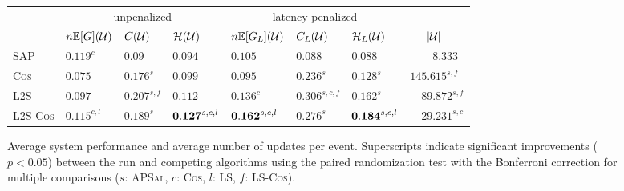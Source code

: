 \begin{figure}[t]
    \center
\begin{tabular}{ l   l l l   l l l  l }
\toprule
   &\multicolumn{3}{c}{unpenalized}&\multicolumn{3}{c}{latency-penalized}&\\
 \cmidrule(lr){2-4} \cmidrule(lr){5-7}
   & $n\mathbb{E}[G](\mathcal{U})$     & $C(\mathcal{U})$ 
        & $\mathcal{H}(\mathcal{U})$ & $n\mathbb{E}[G_L](\mathcal{U})$     & $C_L(\mathcal{U})$ & $\mathcal{H}_L(\mathcal{U})$ & ~~~${\left\vert \mathcal{U} \right\vert}$\\
    \bottomrule
\textsc{SAP}      
    & $\mathbf{0.119}^c$ & $0.09$                     & $0.094$ 
    & $0.105$            & $0.088$                    & $0.088$ 
    & ~~~~$8.333$ \\
\textsc{Cos}     
    & $0.075$            & $0.176^{s}$              & $0.099$ 
    & $0.095$            & $0.236^{s}$              & $0.128^{s}$ 
    & $145.615^{s,f}$ \\
\textsc{L2S}       
    & $0.097$            & $\mathbf{0.207}^{s,f}$   & $0.112$ 
    & $0.136^{c}$      & $\mathbf{0.306}^{s,c,f}$ & $0.162^{s}$
    & ~~$89.872^{s,f}$ \\
\textsc{L2S-Cos}
    & $0.115^{c,l}$        & $0.189^{s}$ & ${\bf0.127}^{s,c,l}$
    & ${\bf0.162}^{s,c,l}$ & $0.276^{s}$ & ${\bf0.184}^{s,c,l}$
 & ~~$29.231^{s,c}$ \\
\bottomrule
\end{tabular}
\caption{
 Average system performance 
 and average number of updates per event.
 Superscripts indicate significant improvements ($p < 0.05$) between the run and
 competing algorithms using the 
  paired randomization test with the Bonferroni correction for multiple 
  comparisons ($s$: \textsc{APSal}, 
 $c$: \textsc{Cos}, $l$: \textsc{LS}, $f$: \textsc{LS-Cos}). 
}
\label{fig:tr15autoresults}
\end{figure}


